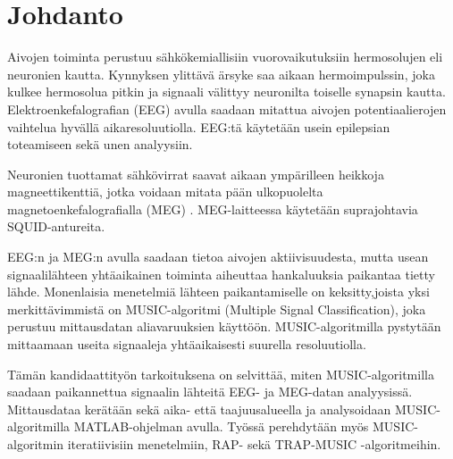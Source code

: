 \section{Johdanto}
Aivojen toiminta perustuu sähkökemiallisiin vuorovaikutuksiin hermosolujen eli neuronien kautta. Kynnyksen ylittävä ärsyke saa aikaan hermoimpulssin, joka kulkee hermosolua pitkin ja signaali välittyy neuronilta toiselle synapsin kautta.\cite{} 
Elektroenkefalografian (EEG) avulla saadaan mitattua aivojen potentiaalierojen vaihtelua hyvällä aikaresoluutiolla. EEG:tä käytetään usein epilepsian toteamiseen sekä unen analyysiin. \cite{Nunez2006ElectricEEG}

Neuronien tuottamat sähkövirrat saavat aikaan ympärilleen heikkoja magneettikenttiä, jotka voidaan mitata pään ulkopuolelta magnetoenkefalografialla (MEG) \cite{Hamalainen1993MagnetoencephalographytheoryBrain}. MEG-laitteessa käytetään suprajohtavia SQUID-antureita. 

EEG:n ja MEG:n avulla saadaan tietoa aivojen aktiivisuudesta, mutta usean signaalilähteen yhtäaikainen toiminta aiheuttaa hankaluuksia paikantaa tietty lähde. Monenlaisia menetelmiä lähteen paikantamiselle on keksitty,joista yksi merkittävimmistä on MUSIC-algoritmi (Multiple Signal Classification), joka perustuu mittausdatan aliavaruuksien käyttöön. MUSIC-algoritmilla pystytään mittaamaan useita signaaleja yhtäaikaisesti suurella resoluutiolla. \cite{Mosher1999SourceMUSIC}

Tämän kandidaattityön tarkoituksena on selvittää, miten MUSIC-algoritmilla saadaan paikannettua signaalin lähteitä EEG- ja MEG-datan analyysissä. Mittausdataa kerätään sekä aika- että taajuusalueella ja analysoidaan MUSIC-algoritmilla MATLAB-ohjelman avulla. Työssä perehdytään myös MUSIC-algoritmin iteratiivisiin menetelmiin, RAP- sekä TRAP-MUSIC -algoritmeihin.
